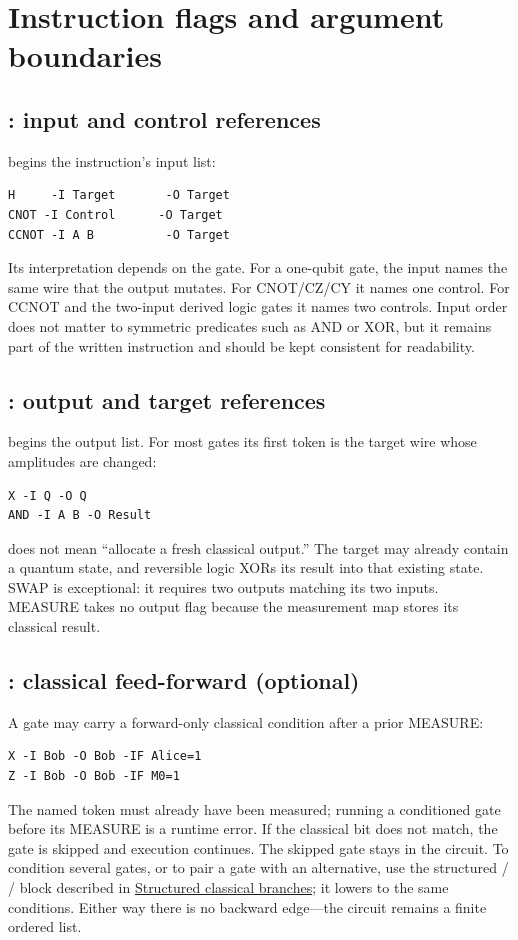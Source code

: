\section{Instruction flags and argument boundaries}

\subsection{: input and control references}

 begins the instruction's input list:
\begin{lstlisting}
H     -I Target       -O Target
CNOT -I Control      -O Target
CCNOT -I A B          -O Target
\end{lstlisting}
Its interpretation depends on the gate. For a one-qubit gate, the input names
the same wire that the output mutates. For CNOT/CZ/CY it names one control. For
CCNOT and the two-input derived logic gates it names two controls. Input order
does not matter to symmetric predicates such as AND or XOR, but it remains part
of the written instruction and should be kept consistent for readability.

\subsection{: output and target references}

 begins the output list. For most gates its first token is the target
wire whose amplitudes are changed:
\begin{lstlisting}
X -I Q -O Q
AND -I A B -O Result
\end{lstlisting}
 does not mean ``allocate a fresh classical output.'' The target may
already contain a quantum state, and reversible logic XORs its result into that
existing state. SWAP is exceptional: it requires two outputs matching its two
inputs. MEASURE takes no output flag because the measurement map stores its
classical result.

\subsection{: classical feed-forward (optional)}

A gate may carry a forward-only classical condition after a prior MEASURE:
\begin{lstlisting}
X -I Bob -O Bob -IF Alice=1
Z -I Bob -O Bob -IF M0=1
\end{lstlisting}
The named token must already have been measured; running a conditioned gate
before its MEASURE is a runtime error. If the classical bit does not match,
the gate is skipped and execution continues. The skipped gate stays in the
circuit. To condition several gates, or to pair a gate with an alternative,
use the structured  /  /  block described in
\hyperlink{if-else-blocks}{Structured classical branches}; it lowers to the
same  conditions. Either way there is no backward edge---the circuit
remains a finite ordered list.

